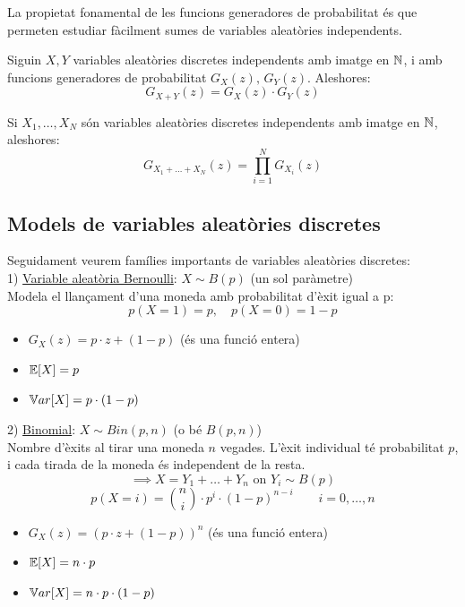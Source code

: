 La propietat fonamental de les funcions generadores de probabilitat és que permeten estudiar 
fàcilment sumes de variables aleatòries independents.

\begin{prop}
  Siguin $X, Y$ variables aleatòries discretes independents amb imatge en $\mathbb{N}$, i amb funcions 
  generadores de probabilitat $G_{X}(z), \, G_{Y}(z)$. Aleshores: 
  \[
    G_{X+Y}(z) = G_{X}(z)\cdot G_{Y}(z)
  \]
\end{prop}

\begin{col}
  Si $X_{1}, \ldots, X_{N}$ són variables aleatòries discretes independents amb imatge en $\mathbb{N}$, aleshores: 
  \[
    G_{X_{1}+\ldots+X_{N}}(z) = \prod_{i=1}^{N} G_{X_{i}}(z)
  \]
\end{col}

\subsection{Models de variables aleatòries discretes}

Seguidament veurem famílies importants de variables aleatòries discretes: \\

1) \underline{Variable aleatòria Bernoulli}: $X\sim B(p)$ \quad (un sol paràmetre) \\
Modela el llançament d'una moneda amb probabilitat d'èxit igual a p: 
\[
  p(X=1) = p, \quad p(X=0) = 1-p
\]
\begin{itemize}
    \item $G_{X}(z) = p\cdot z + (1-p)$ \quad (és una funció entera)
    \item $\mathbb{E}[X] = p$
    \item $\mathbb{V} ar[X] = p\cdot(1-p)$
\end{itemize}

\vspace{0.5cm}

2) \underline{Binomial}: $X\sim Bin(p,n)$ (o bé $B(p,n)$) \\
Nombre d'èxits al tirar una moneda $n$ vegades. L'èxit individual té probabilitat $p$, i cada 
tirada de la moneda és independent de la resta. 
\[
  \implies X=Y_{1}+\ldots+Y_{n} \text{ on } Y_{i}\sim B(p)
\]
\[
  p(X=i) = \binom{n}{i}\cdot p^{i}\cdot (1-p)^{n-i} \qquad i = 0,\ldots,n
\]
\begin{itemize}
    \item $G_{X}(z) = (p\cdot z + (1-p))^{n}$ \quad (és una funció entera)
    \item $\mathbb{E}[X] = n\cdot p$
    \item $\mathbb{V} ar[X] = n\cdot p\cdot (1-p)$
\end{itemize}

